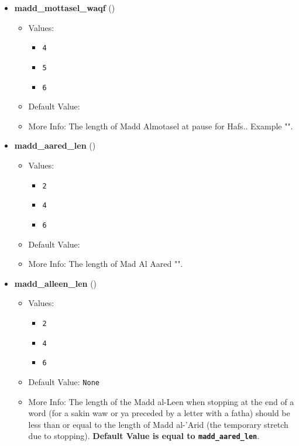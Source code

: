 \begin{itemize}
\item \textbf{madd\_mottasel\_waqf} ()
  \begin{itemize}
  \item Values: 
    \begin{itemize}
    \item  \texttt{4}
    \item  \texttt{5}
    \item  \texttt{6}
    \end{itemize}
  \item Default Value: 
  \item More Info: The length of Madd Almotasel at pause for Hafs.. Example "".
  \end{itemize}

\item \textbf{madd\_aared\_len} ()
  \begin{itemize}
  \item Values: 
    \begin{itemize}
    \item  \texttt{2}
    \item  \texttt{4}
    \item  \texttt{6}
    \end{itemize}
  \item Default Value: 
  \item More Info: The length of Mad Al Aared "".
  \end{itemize}

\item \textbf{madd\_alleen\_len} ()
  \begin{itemize}
  \item Values: 
    \begin{itemize}
    \item  \texttt{2}
    \item  \texttt{4}
    \item  \texttt{6}
    \end{itemize}
  \item Default Value: \texttt{None}
  \item More Info: The length of the Madd al-Leen when stopping at the end of a word (for a sakin waw or ya preceded by a letter with a fatha) should be less than or equal to the length of Madd al-'Arid (the temporary stretch due to stopping). \textbf{Default Value is equal to \texttt{madd\_aared\_len}}. 
  \end{itemize}


\end{itemize}
